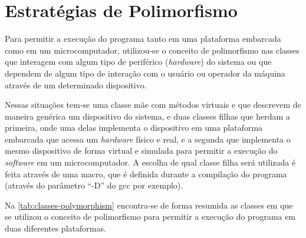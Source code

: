 %
%
%
%
%

%
%
%
%
%

\section{Estratégias de Polimorfismo} \label{sec:polymorphism}

Para permitir a execução do programa tanto em uma plataforma embarcada como em um microcomputador, utilizou-se o conceito de polimorfismo nas classes que interagem com algum tipo de periférico (\textit{hardware}) do sistema ou que dependem de algum tipo de interação com o usuário ou operador da máquina através de um determinado dispositivo.

Nessas situações tem-se uma classe mãe com métodos virtuais e que descrevem de maneira genérica um dispositivo do sistema, e duas classes filhas que herdam a primeira, onde uma delas implementa o dispositivo em uma plataforma embarcada que acessa um \textit{hardware} físico e real, e a segunda que implementa o mesmo dispositivo de forma virtual e simulada para permitir a execução do \textit{software} em um microcomputador. A escolha de qual classe filha será utilizada é feita através de uma macro, que é definida durante a compilação do programa (através do parâmetro ``-D'' do gcc por exemplo).

Na \autoref{tab:classes-polymorphism} encontra-se de forma resumida as classes em que se utilizou o conceito de polimorfismo para permitir a execução do programa em duas diferentes plataformas.

